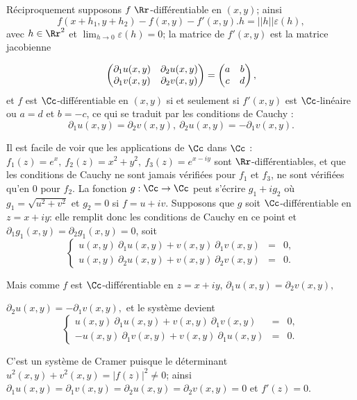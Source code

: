 {\begin{enumerate}
{Réciproquement supposons $f\  \Rr$-différentiable
en $(x,y)$; ainsi
$$f(x+h_1,y+h_2)-f(x,y)-f'(x,y).h=||h||
\varepsilon(h),$$
avec
$h\in\Rr^2$ et $\lim_{h\to
0}\varepsilon(h)=0$; la matrice de $f'(x,y)$ est la matrice jacobienne 

$$\begin{pmatrix}\partial_1u(x,y)&\partial_2u(x,y)\cr \partial_1v(x,y)&
\partial_2v(x,y) \cr \end{pmatrix}=\begin{pmatrix}a&b\cr c&d \cr \end{pmatrix},$$ et $f$ est  
$\Cc$-différentiable en
$(x,y)$ 
si et seulement si $f'(x,y)$ est $\Cc$-linéaire ou  $a=d$ et $b=-c$, ce qui se
traduit par les conditions de Cauchy : 
$$\partial_1u(x,y)=\partial_2v(x,y),\ \partial_2u(x,y)=-\partial_1v(x,y).$$

Il est facile de voir que les applications de $\Cc$ dans
$\Cc$ : $f_1(z)=e^x,\ f_2(z)= x^2+y^2,\ f_3(z)=e^{x-iy}$ sont 
$\Rr$-différentiables, et que les conditions de Cauchy ne sont jamais vérifiées
pour $f_1$ et $f_3$, ne sont vérifiées qu'en $0$ pour $f_2$.
La fonction $g :\Cc\to\Cc$ peut s'écrire $g_1+ig_2$ où
$g_1=\sqrt{u^2+v^2}$ et $g_2=0$ si
$f=u+iv$. Supposons que $g$ soit 
$\Cc$-différentiable en $z=x+iy$: elle remplit donc les conditions de
Cauchy en ce point et $\partial_1g_1(x,y)=\partial_2g_1(x,y)=0$, soit
$$\left \{\begin{array}{ccc}
u(x,y)\ \partial_1u(x,y)+v(x,y)\ \partial_1v(x,y)&=&0,\\
u(x,y)\ \partial_2u(x,y)+v(x,y)\ \partial_2v(x,y)&=&0.
\end{array}\right.
$$

Mais comme $f$ est  
$\Cc$-différentiable en $z=x+iy$, $\partial_1u(x,y)=\partial_2v(x,y),$ 
 
$\partial_2u(x,y)=-\partial_1v(x,y),$ et le système devient
$$\left \{\begin{array}{ccc}
u(x,y)\ \partial_1u(x,y)+v(x,y)\ \partial_1v(x,y)&=&0,\\
-u(x,y)\ \partial_1v(x,y)+v(x,y)\ \partial_1u(x,y)&=&0.
\end{array}\right.
$$

C'est un système de Cramer puisque le déterminant
$u^2(x,y)+v^2(x,y)=|f(z)|^2\not=0$;
ainsi $\partial_1u(x,y)=\partial_1v(x,y)=\partial_2u(x,y)=\partial_2v(x,y)=0$ et
$f'(z)=0$.
}
\end{enumerate}
}
